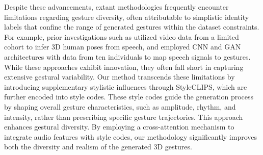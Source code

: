 Despite these advancements, extant methodologies frequently encounter limitations regarding gesture diversity, often attributable to simplistic identity labels that confine the range of generated gestures within the dataset constraints. For example, prior investigations such as \cite{11} utilized video data from a limited cohort to infer 3D human poses from speech, and \cite{13} employed CNN and GAN architectures with data from ten individuals to map speech signals to gestures. While these approaches exhibit innovation, they often fall short in capturing extensive gestural variability. Our method transcends these limitations by introducing supplementary stylistic influences through StyleCLIPS, which are further encoded into style codes. These style codes guide the generation process by shaping overall gesture characteristics, such as amplitude, rhythm, and intensity, rather than prescribing specific gesture trajectories. This approach enhances gestural diversity. By employing a cross-attention mechanism to integrate audio features with style codes, our methodology significantly improves both the diversity and realism of the generated 3D gestures.